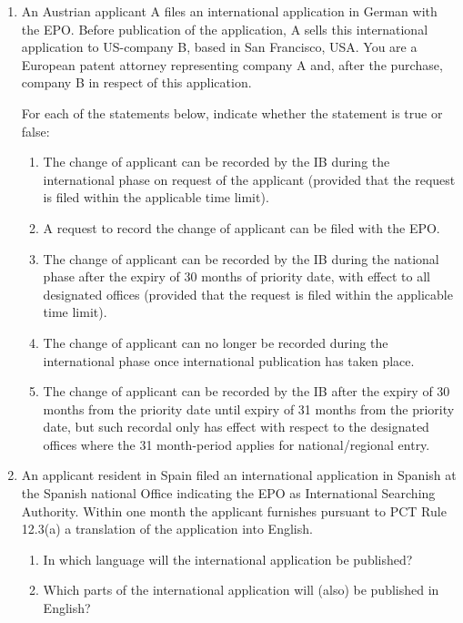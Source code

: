 \documentclass{report}
\begin{document}
\begin{enumerate}[label=\textbf{Question \arabic*}]

    \item %
   An Austrian applicant A files an international application in German with the EPO. Before publication of the application, A sells this international application to US-company B, based in San Francisco, USA.
You are a European patent attorney representing company A and, after the purchase, company B in respect of this application.


For each of the statements below, indicate whether the statement is true or false:

    \begin{enumerate}[label=(\alph*)]
        \item  The change of applicant can be recorded by the IB during the international phase on request of the applicant (provided that the request is filed within the applicable time limit). 
\item A request to record the change of applicant can be filed with the EPO.
\item The change of applicant can be recorded by the IB during the national phase after the expiry of 30 months of priority date, with effect to all designated offices (provided that the request is filed within the applicable time limit).
\item The change of applicant can no longer be recorded during the international phase once international publication has taken place. 
\item The change of applicant can be recorded by the IB after the expiry of 30 months from the priority date until expiry of 31 months from the priority date, but such recordal only has effect with respect to the designated offices where the 31
month-period applies for national/regional entry.

   \end{enumerate}
    
    \item %
An applicant resident in Spain filed an international application in Spanish at the Spanish national Office indicating the EPO as International Searching Authority. Within one month the applicant furnishes pursuant to PCT Rule 12.3(a) a translation of the application into English.
    \begin{enumerate}[label=(\alph*)]
        \item   In which language will the international application be published?
\item  Which parts of the international application will (also) be published in English?
    \end{enumerate}


\end{enumerate}
\end{document}
